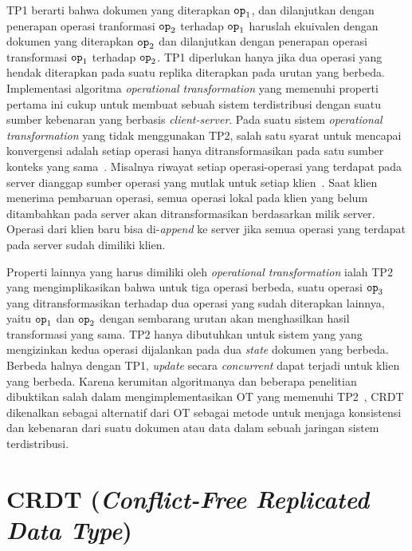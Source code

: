 TP1 berarti bahwa dokumen yang diterapkan $\texttt{op}_1$, dan dilanjutkan dengan penerapan operasi tranformasi $\texttt{op}_2$ terhadap $\texttt{op}_1$ haruslah ekuivalen dengan dokumen yang diterapkan $\texttt{op}_2$ dan dilanjutkan dengan penerapan operasi transformasi $\texttt{op}_1$ terhadap $\texttt{op}_2$. TP1 diperlukan hanya jika dua operasi yang hendak diterapkan pada suatu replika diterapkan pada urutan yang berbeda. Implementasi algoritma \textit{operational transformation} yang memenuhi properti pertama ini cukup untuk membuat sebuah sistem terdistribusi dengan suatu sumber kebenaran yang berbasis \textit{client-server}. Pada suatu sistem \textit{operational transformation} yang tidak menggunakan TP2, salah satu syarat untuk mencapai konvergensi adalah setiap operasi hanya ditransformasikan pada satu sumber konteks yang sama~\citep{Xu2016}. Misalnya riwayat setiap operasi-operasi yang terdapat pada server dianggap sumber operasi yang mutlak untuk setiap klien~\citep{Vidot2000}. Saat klien menerima pembaruan operasi, semua operasi lokal pada klien yang belum ditambahkan pada server akan ditransformasikan berdasarkan milik server. Operasi dari klien baru bisa di-\textit{append} ke server jika semua operasi yang terdapat pada server sudah dimiliki klien.

Properti lainnya yang harus dimiliki oleh \textit{operational transformation} ialah TP2 yang mengimplikasikan bahwa untuk tiga operasi berbeda, suatu operasi $\texttt{op}_3$ yang ditransformasikan terhadap dua operasi yang sudah diterapkan lainnya, yaitu $\texttt{op}_1$ dan $\texttt{op}_2$ dengan sembarang urutan akan menghasilkan hasil transformasi yang sama. TP2 hanya dibutuhkan untuk sistem yang yang mengizinkan kedua operasi dijalankan pada dua \textit{state} dokumen yang berbeda. Berbeda halnya dengan TP1, \textit{update} secara \textit{concurrent} dapat terjadi untuk klien yang berbeda. Karena kerumitan algoritmanya dan beberapa penelitian dibuktikan salah dalam mengimplementasikan OT yang memenuhi TP2~\citep{OTOverview1}, CRDT dikenalkan sebagai alternatif dari OT sebagai metode untuk menjaga konsistensi dan kebenaran dari suatu dokumen atau data dalam sebuah jaringan sistem terdistribusi.

\section{CRDT (\textit{Conflict-Free Replicated Data Type})}

